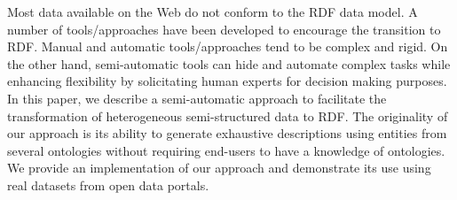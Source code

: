 Most data available on the Web do not conform to the RDF data model. A number of tools/approaches have been developed to encourage the transition to RDF. Manual and automatic tools/approaches tend to be complex and rigid. On the other hand, semi-automatic tools can hide and automate complex tasks while enhancing flexibility by solicitating human experts for decision making purposes. In this paper, we describe a semi-automatic approach to facilitate the transformation of heterogeneous semi-structured data to RDF. The originality of our approach is its ability to generate exhaustive descriptions using entities from several ontologies without requiring end-users to have a knowledge of ontologies. We provide an implementation of our approach and demonstrate its use using real datasets from open data portals.




